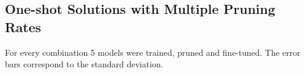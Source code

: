 %
%
%
\subsection{One-shot Solutions with Multiple Pruning Rates}
\label{subsec:OneShotPruningRates}
For every combination 5 models were trained, pruned and fine-tuned. The error bars correspond to the standard deviation.


